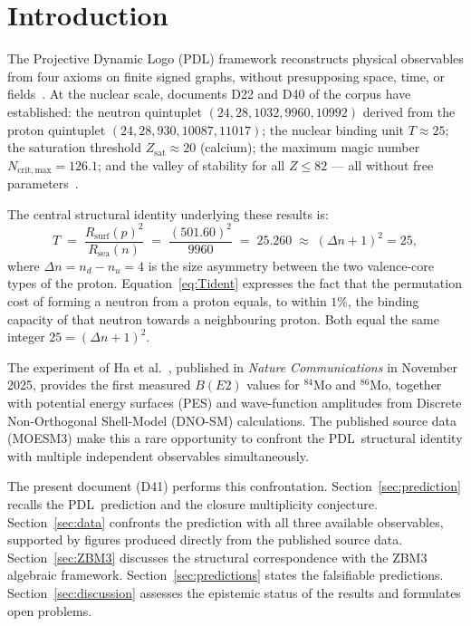 \documentclass[11pt,a4paper]{article}
\theoremstyle{definition}
\newcommand{\PDL}{\textnormal{PDL}}
\newcommand{\Rsurf}{R_{\mathrm{surf}}}
\newcommand{\Rsea}{R_{\mathrm{sea}}}
\newcommand{\Dn}{\Delta n}
\newcommand{\Tpdl}{T}
\begin{document}
\section{Introduction}
\label{sec:intro}

The Projective Dynamic Logo (\PDL) framework reconstructs physical
observables from four axioms on finite signed graphs, without presupposing
space, time, or fields~\cite{PDL_D01_2026,PDL_D02_2026}. At the nuclear
scale, documents D22 and D40 of the corpus have established: the neutron
quintuplet $(24,28,1032,9960,10992)$ derived from the proton quintuplet
$(24,28,930,10087,11017)$; the nuclear binding unit $\Tpdl \approx 25$; the
saturation threshold $Z_{\mathrm{sat}} \approx 20$ (calcium); the maximum
magic number $N_{\mathrm{crit,max}} = 126.1$; and the valley of stability for
all $Z \leq 82$ --- all without free
parameters~\cite{PDL_D22_2026,PDL_D40_2026}.

The central structural identity underlying these results is:
\begin{equation}
  \Tpdl
  \;=\; \frac{\Rsurf(p)^2}{\Rsea(n)}
  \;=\; \frac{(501.60)^2}{9960}
  \;=\; 25.260
  \;\approx\; (\Dn+1)^2 = 25,
  \label{eq:Tident}
\end{equation}
where $\Dn = n_d - n_u = 4$ is the size asymmetry between the two
valence-core types of the proton. Equation~\eqref{eq:Tident} expresses the
fact that the permutation cost of forming a neutron from a proton equals,
to within $1\%$, the binding capacity of that neutron towards a neighbouring
proton. Both equal the same integer $25 = (\Dn+1)^2$.

The experiment of Ha et al.~\cite{Ha_2025}, published in
\textit{Nature Communications} in November 2025, provides the first measured
$B(E2)$ values for $^{84}$Mo and $^{86}$Mo, together with potential energy
surfaces (PES) and wave-function amplitudes from Discrete Non-Orthogonal
Shell-Model (DNO-SM) calculations. The published source data (MOESM3) make
this a rare opportunity to confront the \PDL\ structural identity with
multiple independent observables simultaneously.

The present document (D41) performs this confrontation. Section~\ref{sec:prediction}
recalls the \PDL\ prediction and the closure multiplicity conjecture.
Section~\ref{sec:data} confronts the prediction with all three available
observables, supported by figures produced directly from the published source
data. Section~\ref{sec:ZBM3} discusses the structural correspondence with the
ZBM3 algebraic framework. Section~\ref{sec:predictions} states the falsifiable
predictions. Section~\ref{sec:discussion} assesses the epistemic status of the
results and formulates open problems.
\end{document}
